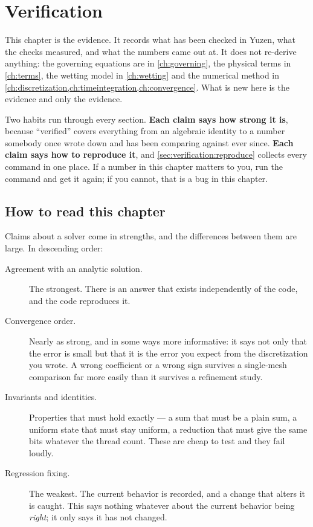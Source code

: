 \chapter{Verification}
\label{ch:verification}

This chapter is the evidence. It records what has been checked in Yuzen, what
the checks measured, and what the numbers came out at. It does not re-derive
anything: the governing equations are in \cref{ch:governing}, the physical
terms in \cref{ch:terms}, the wetting model in \cref{ch:wetting} and the
numerical method in \cref{ch:discretization,ch:timeintegration,ch:convergence}.
What is new here is the evidence and only the evidence.

Two habits run through every section. \textbf{Each claim says how strong it
is}, because ``verified'' covers everything from an algebraic identity to a
number somebody once wrote down and has been comparing against ever since.
\textbf{Each claim says how to reproduce it}, and
\cref{sec:verification:reproduce} collects every command in one place. If a
number in this chapter matters to you, run the command and get it again; if you
cannot, that is a bug in this chapter.

\section{How to read this chapter}
\label{sec:verification:policy}

Claims about a solver come in strengths, and the differences between them are
large. In descending order:

\begin{description}
  \item[Agreement with an analytic solution.] The strongest. There is an
    answer that exists independently of the code, and the code reproduces it.
  \item[Convergence order.] Nearly as strong, and in some ways more
    informative: it says not only that the error is small but that it is the
    error you expect from the discretization you wrote. A wrong coefficient or
    a wrong sign survives a single-mesh comparison far more easily than it
    survives a refinement study.
  \item[Invariants and identities.] Properties that must hold exactly ---
    a sum that must be a plain sum, a uniform state that must stay uniform, a
    reduction that must give the same bits whatever the thread count. These
    are cheap to test and they fail loudly.
  \item[Regression fixing.] The weakest. The current behavior is recorded, and
    a change that alters it is caught. This says nothing whatever about the
    current behavior being \emph{right}; it only says it has not changed.
\end{description}

